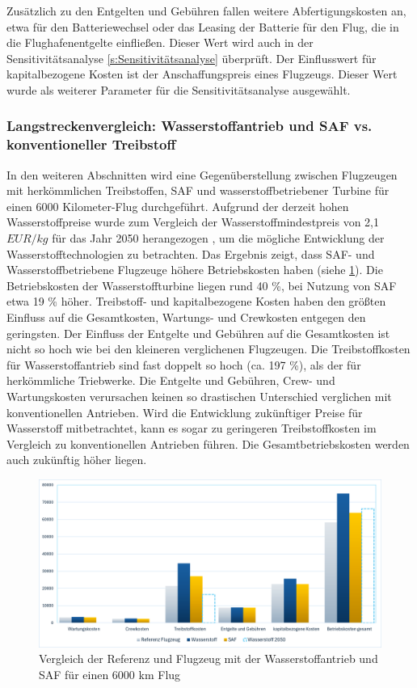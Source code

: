Zusätzlich zu den Entgelten und Gebühren fallen weitere Abfertigungskosten an,
etwa für den Batteriewechsel oder das Leasing der Batterie für den Flug,
die in die Flughafenentgelte einfließen.
Dieser Wert wird auch in der Sensitivitätsanalyse \ref{s:Sensitivitätsanalyse} überprüft. 
Der Einflusswert für kapitalbezogene Kosten ist der Anschaffungspreis eines Flugzeugs. 
Dieser Wert wurde als weiterer Parameter für die Sensitivitätsanalyse ausgewählt.\\

\subsubsection{Langstreckenvergleich: Wasserstoffantrieb und SAF vs. konventioneller Treibstoff}
In den weiteren Abschnitten wird eine Gegenüberstellung zwischen Flugzeugen mit herkömmlichen Treibstoffen, 
SAF und wasserstoffbetriebener Turbine für einen 6000 Kilometer-Flug durchgeführt. %
Aufgrund der derzeit hohen Wasserstoffpreise wurde zum Vergleich der Wasserstoffmindestpreis 
von 2,1 $EUR/kg$ für das Jahr 2050 herangezogen \cite{hoelzen2022hydrogen}, 
um die mögliche Entwicklung der Wasserstofftechnologien zu betrachten.
%
Das Ergebnis zeigt, dass SAF- und Wasserstoffbetriebene Flugzeuge 
höhere Betriebskosten haben (siehe \ref{vergleichWA_Ref}).
Die Betriebskosten der Wasserstoffturbine liegen rund 40 \%, bei Nutzung von SAF etwa 19 \% höher.
Treibstoff- und kapitalbezogene Kosten haben den größten Einfluss auf die Gesamtkosten, 
Wartungs- und Crewkosten entgegen den geringsten.
Der Einfluss der Entgelte und Gebühren auf die Gesamtkosten ist nicht so hoch
wie bei den kleineren verglichenen Flugzeugen.
Die Treibstoffkosten für Wasserstoffantrieb sind fast doppelt so hoch (ca. 197 \%), als der für herkömmliche Triebwerke. 
Die Entgelte und Gebühren, Crew- und Wartungskosten verursachen keinen so 
drastischen Unterschied verglichen mit konventionellen Antrieben. 
%
Wird die Entwicklung zukünftiger Preise für Wasserstoff mitbetrachtet, 
kann es sogar zu geringeren Treibstoffkosten im Vergleich zu konventionellen Antrieben führen. 
Die Gesamtbetriebskosten werden auch zukünftig höher liegen.

\begin{figure}[h]
	\centering
	\includegraphics[width=0.9\linewidth]{Bilder/VergleichWA_SAF.png}
	\caption[Betriebskosten]{Vergleich der Referenz und Flugzeug mit der Wasserstoffantrieb und SAF für einen 6000 km Flug}
	\label{vergleichWA_Ref}
\end{figure}

